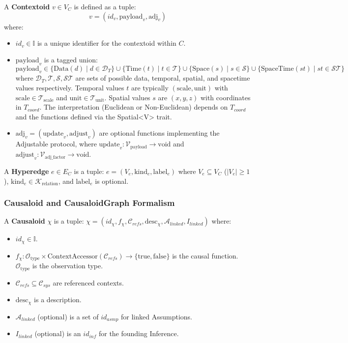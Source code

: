 A \textbf{Contextoid} $ v \in V_C $ is defined as a tuple:
\[ v = (id_v, \text{payload}_v, \text{adj}_v) \]
where:
\begin{itemize}
    \item $ id_v \in \mathbb{I} $ is a unique identifier for the contextoid within $ C $.
    \item $ \text{payload}_v $ is a tagged union:
    \[ \text{payload}_v \in \{ \text{Data}(d) \mid d \in \mathcal{D}_T \} \cup \{ \text{Time}(t) \mid t \in \mathcal{T} \} \cup \{ \text{Space}(s) \mid s \in \mathcal{S} \} \cup \{ \text{SpaceTime}(st) \mid st \in \mathcal{ST} \} \]
    where $\mathcal{D}_T, \mathcal{T}, \mathcal{S}, \mathcal{ST}$ are sets of possible data, temporal, spatial, and spacetime values respectively. Temporal values $t$ are typically $(\text{scale}, \text{unit})$ with $\text{scale} \in \mathcal{T}_{\text{scale}}$ and $\text{unit} \in \mathcal{T}_{\text{unit}}$. Spatial values $s$ are $(x,y,z)$ with coordinates in $T_{coord}$. The interpretation (Euclidean or Non-Euclidean) depends on $T_{coord}$ and the functions defined via the Spatial<V> trait.
    \item $ \text{adj}_v = (\text{update}_v, \text{adjust}_v) $ are optional functions implementing the Adjustable protocol, where $ \text{update}_v: \mathcal{V}_{\text{payload}} \to \text{void} $ and $ \text{adjust}_v: \mathcal{V}_{\text{adj\_factor}} \to \text{void} $.
\end{itemize}

\newpage

A \textbf{Hyperedge} $ e \in E_C $ is a tuple: $ e = (V_e, \text{kind}_e, \text{label}_e) $
where $ V_e \subseteq V_C $ ($|V_e| \ge 1$), $\text{kind}_e \in \mathcal{K}_{\text{relation}}$, and $\text{label}_e$ is optional.

\subsubsection{Causaloid and CausaloidGraph Formalism}
\label{subsubsec:causaloid_graph_formalism}

A \textbf{Causaloid} $ \chi $ is a tuple: $ \chi = (id_\chi, f_\chi, \mathcal{C}_{refs}, \text{desc}_\chi, \mathcal{A}_{linked}, I_{linked}) $
where:
\begin{itemize}
    \item $ id_\chi \in \mathbb{I} $.
    \item $ f_\chi: \mathcal{O}_{\text{type}} \times \text{ContextAccessor}(\mathcal{C}_{refs}) \to \{\text{true}, \text{false}\} $ is the causal function. $\mathcal{O}_{\text{type}}$ is the observation type.
    \item $ \mathcal{C}_{refs} \subseteq \mathcal{C}_{sys} $ are referenced contexts.
    \item $ \text{desc}_\chi $ is a description.
    \item $ \mathcal{A}_{linked} $ (optional) is a set of $id_{asmp}$ for linked Assumptions.
    \item $ I_{linked} $ (optional) is an $id_{inf}$ for the founding Inference.
\end{itemize}

